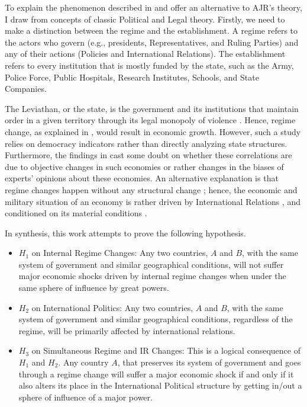 \documentclass[11pt]{article}
\begin{document}
To explain the phenomenon described in \textcite{little_meng_2024} and offer an alternative to AJR's theory, I draw from concepts of classic Political and Legal theory. Firstly, we need to make a distinction between the regime and the establishment. A regime refers to the actors who govern (e.g., presidents, Representatives, and Ruling Parties) and any of their actions (Policies and International Relations). The establishment refers to every institution that is mostly funded by the state, such as the Army, Police Force, Public Hospitals, Research Institutes, Schools, and State Companies.

The Leviathan, or the state, is the government and its institutions that maintain order in a given
territory through its legal monopoly of violence \parencite{hobbes1651leviathan,weber1922wirtschaft}. Hence, regime change, as explained in \textcite{acemoglu_naidu_restrepo_robinson_2019}, would result in economic growth. However, such a study relies on democracy indicators rather than directly analyzing state structures. Furthermore, the findings in \textcite{little_meng_2024} cast some doubt on whether these correlations are due to objective changes in such economies or rather changes in the biases of experts' opinions about these economies. An alternative explanation is that regime changes happen without any structural change \parencite{garciatrevijano2010}; hence, the economic and military situation of an economy is rather driven by International Relations \parencite{waltz_1979, mearsheimer_2001}, and conditioned on its material conditions \parencite{riedel_sachs_2005}.

In synthesis, this work attempts to prove the following hypothesis.

\begin{itemize}
    \item $H_1$ on Internal Regime Changes: Any two countries, $A$ and $B$, with the same system of government and similar geographical conditions, will not suffer major economic shocks driven by internal regime changes when under the same sphere of influence by great powers.
    \item $H_2$ on International Politics: Any two countries, $A$ and $B$, with the same system of government and similar geographical conditions, regardless of the regime, will be primarily affected by international relations.
    \item $H_3$ on Simultaneous Regime and IR Changes: This is a logical consequence of $H_1$ and $H_2$. Any country $A$, that preserves its system of government and goes through a regime change will suffer a major economic shock if and only if it also alters its place in the International Political structure by getting in/out a sphere of influence of a major power.
\end{itemize}
\end{document}
